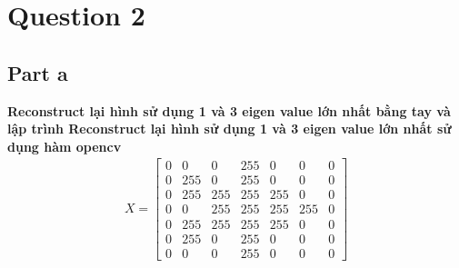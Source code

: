 \section{Question 2}
   \subsection{Part a}
        \hspace*{0.6cm}\textbf{Reconstruct lại hình sử dụng 1 và 3 eigen value lớn nhất bằng tay và lập trình Reconstruct lại hình sử
dụng 1 và 3 eigen value lớn nhất sử dụng hàm opencv }
        \begin{align*}
            X = \begin{bmatrix}
            0 & 0 & 0 & 255 & 0 & 0 & 0 \\
            0 & 255 & 0 & 255 & 0 & 0 & 0 \\
            0 & 255 & 255 & 255 & 255 & 0 & 0 \\
            0 & 0 & 255 & 255 & 255 & 255 & 0 \\
            0 & 255 & 255 & 255 & 255 & 0 & 0 \\
            0 & 255 & 0 & 255 & 0 & 0 & 0 \\
            0 & 0 & 0 & 255 & 0 & 0 & 0
            \end{bmatrix}
        \end{align*}
